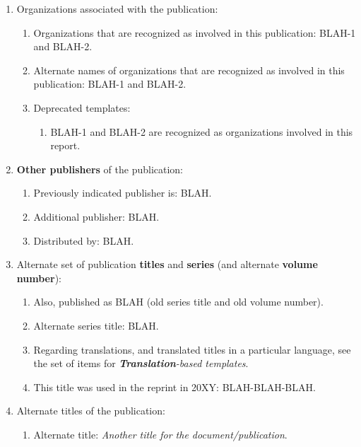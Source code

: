 \documentclass[letter,12pt]{article}
\begin{document}
\begin{enumerate}
\begin{enumerate}
\begin{enumerate}
		\end{enumerate}
	\item Organizations associated with the publication: \vspace{-0.2cm}
		\begin{enumerate} \itemsep -2pt
		\item Organizations that are recognized as involved in this publication: BLAH-1 and BLAH-2.
		\item Alternate names of organizations that are recognized as involved in this publication: BLAH-1 and BLAH-2.
		\item Deprecated templates: \vspace{-0.1cm}
			\begin{enumerate} \itemsep -1pt
			\item BLAH-1 and BLAH-2 are recognized as organizations involved in this report.
			\end{enumerate}
		\end{enumerate}
	\item {\bf Other publishers} of the publication: \vspace{-0.2cm}
		\begin{enumerate} \itemsep -2pt
		\item Previously indicated publisher is: BLAH.
		\item Additional publisher: BLAH.
		\item Distributed by: BLAH.
		\end{enumerate}
	\item Alternate set of publication {\bf titles} and {\bf series} (and alternate {\bf volume number}): \vspace{-0.2cm}
		\begin{enumerate} \itemsep -2pt
		\item Also, published as BLAH (old series title and old volume number).
		\item Alternate series title: BLAH.
		\item Regarding translations, and translated titles in a particular language, see the set of items for {\it {\bf Translation}-based templates}.
		\item This title was used in the reprint in 20XY: BLAH-BLAH-BLAH.
		\end{enumerate}
	\item Alternate titles of the publication: \vspace{-0.2cm}
		\begin{enumerate} \itemsep -2pt
		\item Alternate title: {\it Another title for the document/publication}.

\end{enumerate}
\end{enumerate}
\end{enumerate}
\end{document}
